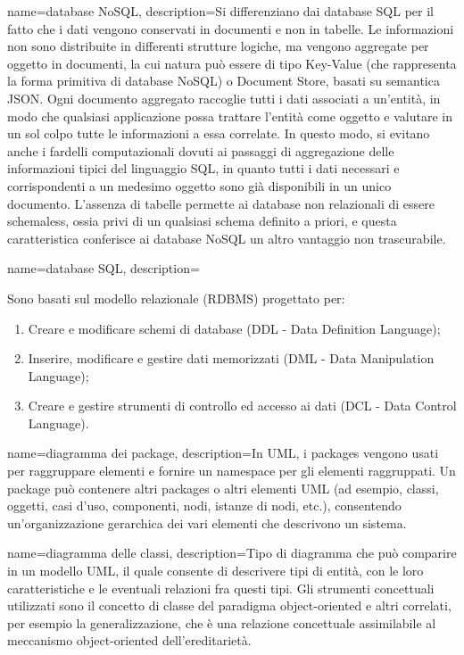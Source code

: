 \hypertarget{D}{}

{
	name=database NoSQL,
	description={Si differenziano dai database SQL per il fatto che i dati vengono conservati in documenti e non in tabelle. Le informazioni non sono distribuite in differenti strutture logiche, ma vengono aggregate per oggetto in documenti, la cui natura può essere di tipo Key-Value (che rappresenta la forma primitiva di database NoSQL) o Document Store, basati su semantica JSON. Ogni documento aggregato raccoglie tutti i dati associati a un’entità, in modo che qualsiasi applicazione possa trattare l’entità come oggetto e valutare in un sol colpo tutte le informazioni a essa correlate. In questo modo, si evitano anche i fardelli computazionali dovuti ai passaggi di aggregazione delle informazioni tipici del linguaggio SQL, in quanto tutti i dati necessari e corrispondenti a un medesimo oggetto sono già disponibili in un unico documento. L’assenza di tabelle permette ai database non relazionali di essere schemaless, ossia privi di un qualsiasi schema definito a priori, e questa caratteristica conferisce ai database NoSQL un altro vantaggio non trascurabile.}
}

{
	name=database SQL,
	description={Sono basati sul modello relazionale (RDBMS) progettato per:
		\begin{enumerate}  
			\item Creare e modificare schemi di database (DDL - Data Definition Language);
			\item Inserire, modificare e gestire dati memorizzati (DML - Data Manipulation Language);
			\item Creare e gestire strumenti di controllo ed accesso ai dati (DCL - Data Control Language).
		\end{enumerate}
	}
}

{
	name=diagramma dei package,
	description={In UML, i packages vengono usati per raggruppare elementi e fornire un namespace per gli elementi raggruppati. Un package può contenere altri packages o altri elementi UML (ad esempio, classi, oggetti, casi d'uso, componenti, nodi, istanze di nodi, etc.), consentendo un'organizzazione gerarchica dei vari elementi che descrivono un sistema.}
}

{
	name=diagramma delle classi,
	description={Tipo di diagramma che può comparire in un modello UML, il quale consente di descrivere tipi di entità, con le loro caratteristiche e le eventuali relazioni fra questi tipi. Gli strumenti concettuali utilizzati sono il concetto di classe del paradigma object-oriented e altri correlati, per esempio la generalizzazione, che è una relazione concettuale assimilabile al meccanismo object-oriented dell'ereditarietà.}
}

